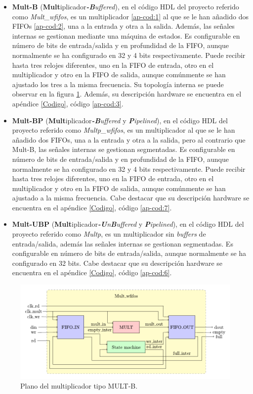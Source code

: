 \begin{itemize}
    \item \textbf{Mult-B} (\textbf{Mult}iplicador\textit{\textbf{-B}uffered}), en el código HDL del proyecto referido como \textit{Mult\_wfifos}, es un multiplicador \ref{ap-cod:1} al que se le han añadido dos FIFOs \ref{ap-cod:2}, una a la entrada y otra a la salida.
Además, las señales internas se gestionan mediante una máquina de estados. 
Es configurable en número de bits de entrada/salida y en profundidad de la FIFO, aunque normalmente se ha configurado en 32 y 4 bits respectivamente.
Puede recibir hasta tres relojes diferentes, uno en la FIFO de entrada, otro en el multiplicador y otro en la FIFO de salida, aunque comúnmente se han ajustado los tres a la misma frecuencia.
Su topología interna se puede observar en la figura \ref{fig:mult-b}.
Además, su descripción hardware se encuentra en el apéndice \ref{Codigo}, código \ref{ap-cod:3}.
\item \textbf{Mult-BP} (\textbf{Mult}iplicador\textit{\textbf{-B}uffered} y \textit{\textbf{P}ipelined}), en el código HDL del proyecto referido como \textit{Multp\_wfifos}, es un multiplicador al que se le han añadido dos FIFOs, una a la entrada y otra a la salida, pero al contrario que Mult-B, las señales internas se gestionan segmentadas.
Es configurable en número de bits de entrada/salida y en profundidad de la FIFO, aunque normalmente se ha configurado en 32 y 4 bits respectivamente.
Puede recibir hasta tres relojes diferentes, uno en la FIFO de entrada, otro en el multiplicador y otro en la FIFO de salida, aunque comúnmente se han ajustado a la misma frecuencia.
Cabe destacar que su descripción hardware se encuentra en el apéndice \ref{Codigo}, código \ref{ap-cod:7}.
\item \textbf{Mult-UBP} (\textbf{Mult}iplicador\textit{\textbf{-U}n\textbf{B}uffered} y \textit{\textbf{P}ipelined}), en el código HDL del proyecto referido como \textit{Multp}, es un multiplicador sin \textit{buffers} de entrada/salida, además las señales internas se gestionan segmentadas.
Es configurable en número de bits de entrada/salida, aunque normalmente se ha configurado en 32 bits.
Cabe destacar que su descripción hardware se encuentra en el apéndice \ref{Codigo}, código \ref{ap-cod:6}.
\end{itemize}

\begin{figure}[h!]
    \centering
    \includegraphics[width=15cm]{Figuras/mult_wfifos.pdf}
    \caption{Plano del multiplicador tipo MULT-B.}
    \label{fig:mult-b}
\end{figure}

